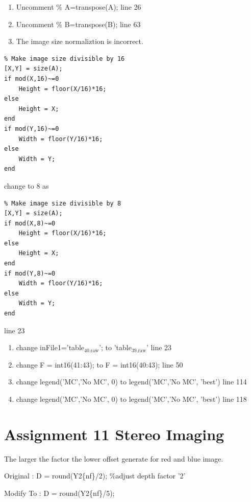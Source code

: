 \documentclass[titlepage]{article}
\begin{document}
\begin{enumerate}
\item Uncomment \% A=transpose(A);  line 26
\item Uncomment \% B=transpose(B);  line 63
\item The image size normaliztion is incorrect.
\end{enumerate}
\begin{verbatim}
% Make image size divisible by 16
[X,Y] = size(A);
if mod(X,16)~=0
    Height = floor(X/16)*16;
else
    Height = X;
end
if mod(Y,16)~=0
    Width = floor(Y/16)*16;
else
    Width = Y;
end
\end{verbatim}

change to 8 as

\begin{verbatim}
% Make image size divisible by 8
[X,Y] = size(A);
if mod(X,8)~=0
    Height = floor(X/16)*16;
else
    Height = X;
end
if mod(Y,8)~=0
    Width = floor(Y/16)*16;
else
    Width = Y;
end

\end{verbatim}

line 23

\begin{enumerate}
\item change inFile1='table\(_{\text{40.raw}}\)'; to 'table\(_{\text{39.raw}}\)' line 23
\item change F = int16(41:43); to F = int16(40:43); line 50
\item change legend('MC','No MC', 0) to legend('MC','No MC', 'best') line 114
\item change legend('MC','No MC', 0) to legend('MC','No MC', 'best') line 118
\end{enumerate}


\newpage

\section{Assignment 11 Stereo Imaging}
\label{sec:org9ab7902}

The larger the factor the lower offset generate for red and blue image.

Original : D = round(Y2\{nf\}/2);  \%adjust depth factor '2'

Modify To : D = round(Y2\{nf\}/5);
\end{document}

